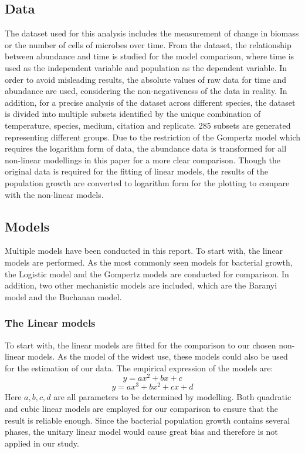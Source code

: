 \documentclass[11pt, oneside]{article}
\begin{document}
 		\subsection{Data}
 
		The dataset used for this analysis includes the measurement of change in biomass or the number of cells of microbes over time. From the dataset, the relationship between abundance and time is studied for the model comparison, where time is used as the independent variable and population as the dependent variable. In order to avoid misleading results, the absolute values of raw data for time and abundance are used, considering the non-negativeness of the data in reality. In addition, for a precise analysis of the dataset across different species, the dataset is divided into multiple subsets identified by the unique combination of temperature, species, medium, citation and replicate. 285 subsets are generated representing different groups. Due to the restriction of the Gompertz model which requires the logarithm form of data, the abundance data is transformed for all non-linear modellings in this paper for a more clear comparison. Though the original data is required for the fitting of linear models, the results of the population growth are converted to logarithm form for the plotting to compare with the non-linear models.

 		\subsection{Models}
 
 		Multiple models have been conducted in this report. To start with, the linear models are performed.  As the most commonly seen models for bacterial growth, the Logistic model and the Gompertz models are conducted for comparison. In addition, two other mechanistic models are included, which are the Baranyi model and the Buchanan model. 
			\subsubsection{The Linear models}
			
			To start with, the linear models are fitted for the comparison to our chosen non-linear models. As the model of the widest use, these models could also be used for the estimation of our data. The empirical expression of the models are:
			\[y = ax^2 + bx + c\]
			\[y = ax^3 + bx^2 + cx + d\]
			\noindent Here \(a, b, c, d\) are all parameters to be determined by modelling. Both quadratic and cubic linear models are employed for our comparison to ensure that the result is reliable enough. Since the bacterial population growth contains several phases, the unitary linear model would cause great bias and therefore is not applied in our study.
			
\end{document}
